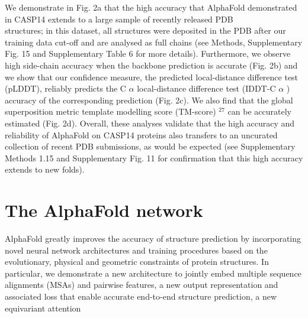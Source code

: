 \documentclass[10pt]{article}
\begin{document}
We demonstrate in Fig. 2a that the high accuracy that AlphaFold demonstrated in CASP14 extends to a large sample of recently released PDB\\
structures; in this dataset, all structures were deposited in the PDB after our training data cut-off and are analysed as full chains (see Methods, Supplementary Fig. 15 and Supplementary Table 6 for more details). Furthermore, we observe high side-chain accuracy when the backbone prediction is accurate (Fig. 2b) and we show that our confidence measure, the predicted local-distance difference test (pLDDT), reliably predicts the C $\alpha$ local-distance difference test (IDDT-C $\alpha$ ) accuracy of the corresponding prediction (Fig. 2c). We also find that the global superposition metric template modelling score (TM-score) ${ }^{27}$ can be accurately estimated (Fig. 2d). Overall, these analyses validate that the high accuracy and reliability of AlphaFold on CASP14 proteins also transfers to an uncurated collection of recent PDB submissions, as would be expected (see Supplementary Methods 1.15 and Supplementary Fig. 11 for confirmation that this high accuracy extends to new folds).

\section*{The AlphaFold network}
AlphaFold greatly improves the accuracy of structure prediction by incorporating novel neural network architectures and training procedures based on the evolutionary, physical and geometric constraints of protein structures. In particular, we demonstrate a new architecture to jointly embed multiple sequence alignments (MSAs) and pairwise features, a new output representation and associated loss that enable accurate end-to-end structure prediction, a new equivariant attention
\end{document}
